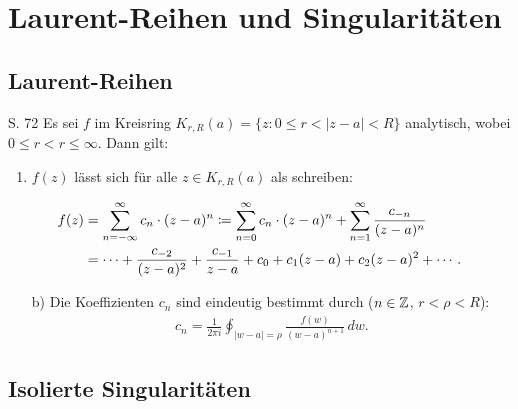 \section{Laurent-Reihen und Singularitäten}


\subsection{Laurent-Reihen}

\begin{satz}{S. 72}
  \label{satz:7_1}
  Es sei $f$ im Kreisring $K_{r,R}(a) = \{ z : 0 \leq r < |z-a| < R \}$ analytisch, wobei $0 \leq r < r \leq \infty$.
  Dann gilt:
  \begin{enumerate}[label=\alph*)]
    \item $f(z)$ lässt sich für alle $z \in K_{r,R}(a)$ als  schreiben:
  \end{enumerate}
  \vspace{-1em}
  \begin{align}
    f(z)
      &= \sum_{n=-\infty}^{\infty} c_n \cdot (z-a)^n
       \coloneqq \sum_{n=0}^{\infty} c_n \cdot (z-a)^n + \sum_{n=1}^{\infty} \frac{c_{-n}}{(z-a)^n}
       \notag\\
      &= \cdots
        + \frac{c_{-2}}{(z-a)^2}
        + \frac{c_{-1}}{z-a}
        + c_0
        + c_1 (z-a)
        + c_2 (z-a)^2
        + \cdots
        .
  \end{align}
  \begin{enumerate}[label=\alph*)]
    \item[b)] Die Koeffizienten $c_n$ sind eindeutig bestimmt durch ($n \in \mathbb{Z}$, $r < \rho < R$):
      \begin{align}
        \label{eq:koeff_c_n}
        c_n = \frac{1}{2 \pi i} \oint_{|w-a| = \rho} \frac{f(w)}{(w-a)^{n+1}} \, dw .
      \end{align}
  \end{enumerate}
\end{satz}

%



\pagebreak
\subsection{Isolierte Singularitäten}

